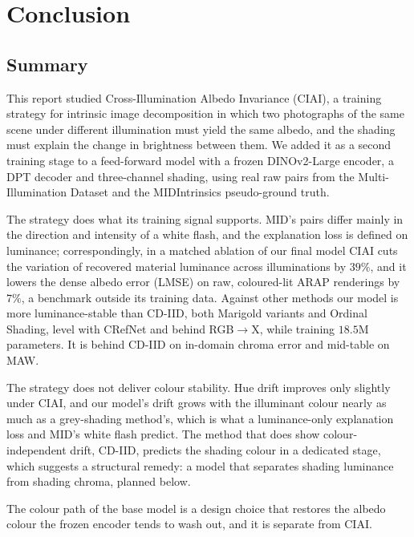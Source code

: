 \chapter{Conclusion}
\label{ch:conclusion}

\section{Summary}

This report studied Cross-Illumination Albedo Invariance (CIAI), a training strategy for
intrinsic image decomposition in which two photographs of the same scene under different
illumination must yield the same albedo, and the shading must explain the change in
brightness between them. We added it as a second training stage to a feed-forward model
with a frozen DINOv2-Large encoder, a DPT decoder and three-channel shading, using real
raw pairs from the Multi-Illumination Dataset and the MIDIntrinsics pseudo-ground truth.

The strategy does what its training signal supports. MID's pairs differ mainly in the
direction and intensity of a white flash, and the explanation loss is defined on
luminance; correspondingly, in a matched ablation of our final model CIAI cuts the
variation of recovered material luminance across illuminations by $39\%$, and it lowers the
dense albedo error (LMSE) on raw, coloured-lit ARAP renderings by $7\%$, a benchmark outside
its training data. Against other methods our model is more luminance-stable than CD-IID, both
Marigold variants and Ordinal Shading, level with CRefNet and behind RGB$\rightarrow$X, while
training $18.5$M parameters. It is behind CD-IID on in-domain chroma error and mid-table on
MAW.

The strategy does not deliver colour stability. Hue drift improves only slightly under
CIAI, and our model's drift grows with the illuminant colour nearly as much as a grey-shading
method's, which is what a luminance-only explanation loss and MID's white flash predict. The
method that does show colour-independent drift, CD-IID, predicts the shading colour in a
dedicated stage, which suggests a structural remedy: a model that separates shading
luminance from shading chroma, planned below.

The colour path of the base model is a design choice that restores the albedo colour the
frozen encoder tends to wash out, and it is separate from CIAI.


